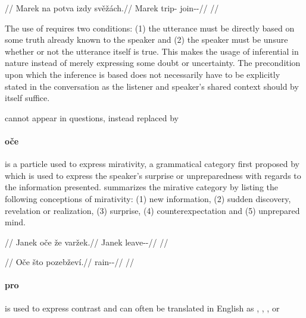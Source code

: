 \pex
\begingl
	\glpreamble {}//
	\gla Marek na potva izdy svěžách.//
	\glb Marek \Loc{} trip-\Acc{} \Infer{} join-\Av{}-\Ctp{}//
	\glft {}//
\endgl
\xe

The use of  requires two conditions: (1) the utterance must be directly
based on some truth already known to the speaker and (2) the speaker must be
unsure whether or not the utterance itself is true. This makes the usage of
 inferential in nature instead of merely expressing some doubt or
uncertainty. The precondition upon which the inference is based does not
necessarily have to be explicitly stated in the conversation as the listener and
speaker's shared context should by itself suffice.

 cannot appear in questions, instead replaced by 

\paragraph{oče}  is a particle used to express
mirativity, a grammatical category first proposed by
\textcite{delancey1997mirativity} which is used to express the speaker's
surprise or unpreparedness with regards to the information presented.
\textcite{aikhenvald2012essence} summarizes the mirative category by listing the
following conceptions of mirativity: (1) new information, (2) sudden discovery,
revelation or realization, (3) surprise, (4) counterexpectation and (5)
unprepared mind.

\pex
\begingl
	\glpreamble {}//
	\gla Janek oče že varžek.//
	\glb Janek \Mir{} \Pfv{} leave-\Av{}-\Pf{}//
	\glft {}//
\endgl
\xe

\pex
\begingl
	\glpreamble {}//
	\gla Oče što pozebževí.//
	\glb \Mir{} \Aff{} rain-\Av{}-\Cont{}//
	\glft {}//
\endgl
{}%
\xe

\paragraph{pro}  is used to express contrast and can often be
translated in English as , , ,
 or 

